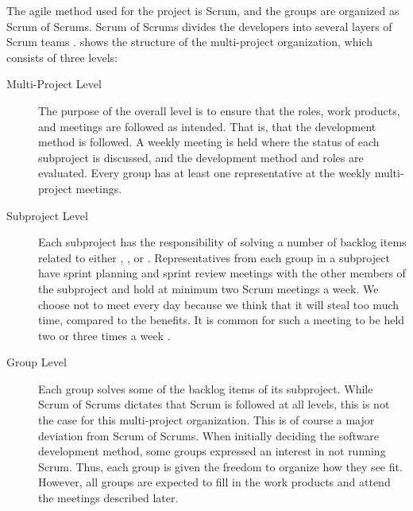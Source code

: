 The agile method used for the project is Scrum, and the groups are organized as Scrum of Scrums. Scrum of Scrums divides the developers into several layers of Scrum teams \parencite{scrum_of_scrums2015}.  shows the structure of the multi-project organization, which consists of three levels:

\begin{description}
  \item[Multi-Project Level] The purpose of the overall level is to ensure that the roles, work products, and meetings are followed as intended. That is, that the development method is followed. A weekly meeting is held where the status of each subproject is discussed, and the development method and roles are evaluated. Every group has at least one representative at the weekly multi-project meetings.
  \item[Subproject Level] Each subproject has the responsibility of solving a number of backlog items related to either \gui, \db, or \bd. Representatives from each group in a subproject have sprint planning and sprint review meetings with the other members of the subproject and hold at minimum two Scrum meetings a week. We choose not to meet every day because we think that it will steal too much time, compared to the benefits. It is common for such a meeting to be held two or three times a week \parencite{scrum_of_scrums2015}.
  \item[Group Level] Each group solves some of the backlog items of its subproject. While Scrum of Scrums dictates that Scrum is followed at all levels, this is not the case for this multi-project organization. This is of course a major deviation from Scrum of Scrums. When initially deciding the software development method, some groups expressed an interest in not running Scrum. Thus, each group is given the freedom to organize how they see fit. However, all groups are expected to fill in the work products and attend the meetings described later.
\end{description}

